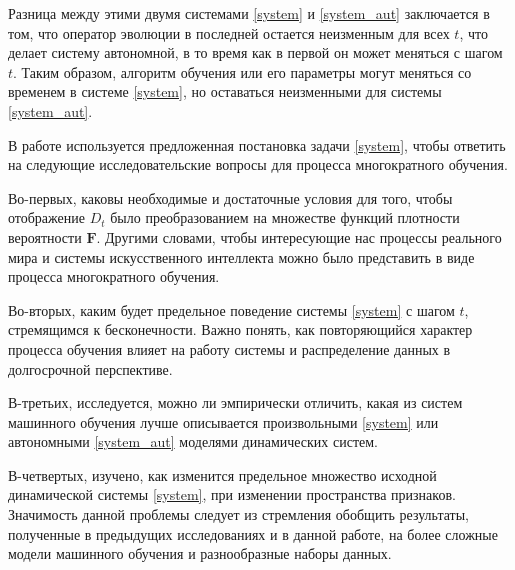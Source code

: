 Разница между этими двумя системами \eqref{system} и \eqref{system_aut} заключается в том, что оператор эволюции в последней остается неизменным для всех $t$, что делает систему автономной, в то время как в первой он может меняться с шагом $t$. Таким образом, алгоритм обучения или его параметры могут меняться со временем в системе \eqref{system}, но оставаться неизменными для системы \eqref{system_aut}.

В работе используется предложенная постановка задачи \eqref{system}, чтобы ответить на следующие исследовательские вопросы для процесса многократного обучения.

Во-первых, каковы необходимые и достаточные условия для того, чтобы отображение $D_t$ было преобразованием на множестве функций плотности вероятности $\textbf{F}$. Другими словами, чтобы интересующие нас процессы реального мира и системы искусственного интеллекта можно было представить в виде процесса многократного обучения.

Во-вторых, каким будет предельное поведение системы \eqref{system} с шагом $t$, стремящимся к бесконечности. Важно понять, как повторяющийся характер процесса обучения влияет на работу системы и распределение данных в долгосрочной перспективе.

В-третьих, исследуется, можно ли эмпирически отличить, какая из систем машинного обучения лучше описывается произвольными \eqref{system} или автономными \eqref{system_aut} моделями динамических систем.

В-четвертых, изучено, как изменится предельное множество исходной динамической системы \eqref{system}, при изменении пространства признаков. Значимость данной проблемы следует из стремления обобщить результаты, полученные в предыдущих исследованиях \cite{khritankov2021hidden, khritankov2023positive} и в данной работе, на более сложные модели машинного обучения и разнообразные наборы данных. 


